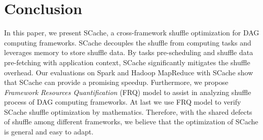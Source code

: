 \section{Conclusion}
In this paper, we present SCache, a cross-framework shuffle optimization for DAG computing frameworks. 
SCache decouples the shuffle from computing tasks and leverages memory to store shuffle data. 
By tasks pre-scheduling and shuffle data pre-fetching with application context, SCache significantly mitigates the shuffle overhead. 
{\color{blue}
Our evaluations on Spark and Hadoop MapReduce with SCache show that SCache can provide a promising speedup. 
Furthermore, we propose \textit{Framework Resources Quantification} (FRQ) model to assist in analyzing shuffle process of DAG computing frameworks. At last we use FRQ model to verify SCache shuffle optimization by mathematics.
Therefore, with the shared defects of shuffle among different frameworks, we believe that the optimization of SCache is general and easy to adapt. 
}
